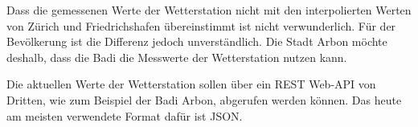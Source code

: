 \noindent
Dass die gemessenen Werte der Wetterstation nicht mit den interpolierten Werten von Zürich und Friedrichshafen übereinstimmt ist nicht verwunderlich. Für der Bevölkerung ist die Differenz jedoch unverständlich. Die Stadt Arbon möchte deshalb, dass die Badi die Messwerte der Wetterstation nutzen kann.
\newline

\noindent
Die aktuellen Werte der Wetterstation sollen über ein REST Web-API von Dritten, wie zum Beispiel der Badi Arbon, abgerufen werden können. Das heute am meisten verwendete Format dafür ist JSON.


